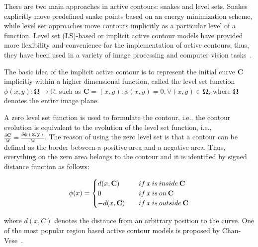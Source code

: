\documentclass{WitsPhysicsReport}
\begin{document}
There are two main approaches in active contours: snakes and level sets. Snakes explicitly move predefined snake points based on an energy minimization scheme, while level set approaches move contours implicitly as a particular level of a function. Level set (LS)-based or implicit active contour models have provided more flexibility and convenience for the implementation of active contours, thus, they have been used in a variety of image processing and computer vision tasks~\cite{le2019recurrent}.


The basic idea of the implicit active contour is to represent the initial curve $\mathbf{C}$ implicitly within a higher dimensional function, called the
level set function $\phi(x,y):\mathbf{\Omega} \rightarrow \mathbb{R}$, such as $\mathbf{C}=(x,y):\phi(x,y)=0,\forall(x,y)\in \mathbf{\Omega} $, where $\mathbf{\Omega}$ denotes the entire image plane. 


A zero level set function is used to formulate the contour, i.e., the contour evolution is equivalent to the evolution of the level set function, i.e.,  $\frac{\partial \mathbf{C} }{\partial t}  =  \frac{\partial \mathbf{\phi(x,y)} }{\partial t}$. The reason of using the zero level set is that a contour can be defined as the border between a positive area and a negative area. Thus, everything on the zero area belongs to the contour and it is identified by signed distance function as follows:



\[ \phi(x) =  \begin{cases} 
      d(x,\mathbf{C})  \quad  & if\hspace{0.2em}x\hspace{0.2em} is \hspace{0.2em} inside \hspace{0.2em} \mathbf{C}  \\
        0 \quad  & if\hspace{0.2em} x\hspace{0.2em} is\hspace{0.2em} on \hspace{0.2em} \mathbf{C}  \\
      -d(x,\mathbf{C})  \quad   &if\hspace{0.2em} x \hspace{0.2em} is\hspace{0.2em} outside \hspace{0.2em} \mathbf{C} 
  \end{cases}
\]

where $d(x,C)$ denotes the distance from an arbitrary position to the curve. One of the most popular region based active contour models is proposed by Chan-Vese~\cite{chan2001active}.
\end{document}
